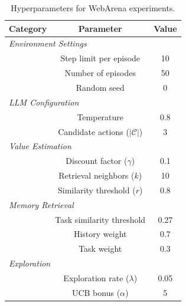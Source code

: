 \begin{table}[h]
\centering
\caption{Hyperparameters for WebArena experiments.}
\label{tab:webarena_hyperparameters}
\vskip 0.1in
\begin{tabular}{lcc}
\toprule
\textbf{Category} & \textbf{Parameter} & \textbf{Value} \\
\midrule
\multicolumn{3}{l}{\textit{Environment Settings}} \\
\addlinespace[2pt]
& Step limit per episode & 10 \\
& Number of episodes & 50 \\
& Random seed & 0 \\
\midrule
\multicolumn{3}{l}{\textit{LLM Configuration}} \\
\addlinespace[2pt]
& Temperature & 0.8 \\
& Candidate actions ($|\mathcal{C}|$) & 3 \\
\midrule
\multicolumn{3}{l}{\textit{Value Estimation}} \\
\addlinespace[2pt]
& Discount factor ($\gamma$) & 0.1 \\
& Retrieval neighbors ($k$) & 10 \\
& Similarity threshold ($r$) & 0.8 \\
\midrule
\multicolumn{3}{l}{\textit{Memory Retrieval}} \\
\addlinespace[2pt]
& Task similarity threshold & 0.27 \\
& History weight & 0.7 \\
& Task weight & 0.3 \\
\midrule
\multicolumn{3}{l}{\textit{Exploration}} \\
\addlinespace[2pt]
& Exploration rate ($\lambda$) & 0.05 \\
& UCB bonus ($\alpha$) & 5  \\
\bottomrule
\end{tabular}
\end{table}



